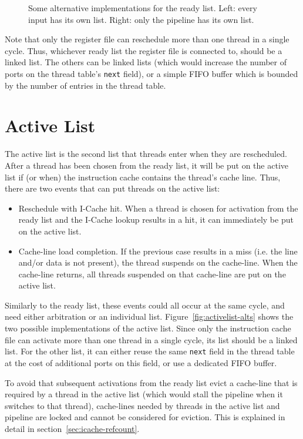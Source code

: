 \begin{figure}
 \begin{center}
  
  \caption{Some alternative implementations for the ready list. Left: every input has its own list. Right: only the pipeline has its own list.}
  \label{fig:readylist-alts}
 \end{center}
\end{figure}

Note that only the register file can reschedule more than one thread in a single cycle. Thus, whichever ready list the register file is connected to, should be a linked list. The others can be linked lists (which would increase the number of ports on the thread table's {\tt next} field), or a simple FIFO buffer which is bounded by the number of entries in the thread table.

\section{Active List}
The active list is the second list that threads enter when they are rescheduled. After a thread has been chosen from the ready list, it will be put on the active list if (or when) the instruction cache contains the thread's cache line. Thus, there are two events that can put threads on the active list:
\begin{itemize}
\item{} Reschedule with I-Cache hit. When a thread is chosen for activation from the ready list and the I-Cache lookup results in a hit, it can immediately be put on the active list.
\item{} Cache-line load completion. If the previous case results in a miss (i.e. the line and/or data is not present), the thread suspends on the cache-line. When the cache-line returns, all threads suspended on that cache-line are put on the active list.
\end{itemize}

Similarly to the ready list, these events could all occur at the same cycle, and need either arbitration or an individual list. Figure~\ref{fig:activelist-alts} shows the two possible implementations of the active list. Since only the instruction cache file can activate more than one thread in a single cycle, its list should be a linked list. For the other list, it can either reuse the same {\tt next} field in the thread table at the cost of additional ports on this field, or use a dedicated FIFO buffer.

To avoid that subsequent activations from the ready list evict a cache-line that is required by a thread in the active list (which would stall the pipeline when it switches to that thread), cache-lines needed by threads in the active list and pipeline are locked and cannot be considered for eviction. This is explained in detail in section~\ref{sec:icache-refcount}.

